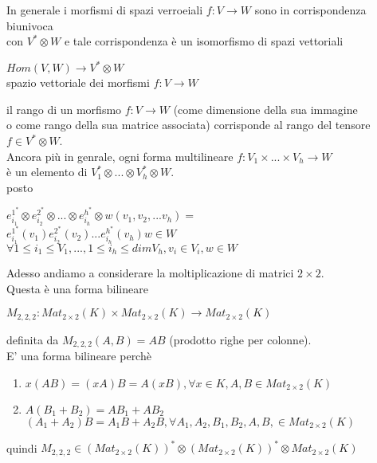 \documentclass[a4paper,12pt]{article}
\theoremstyle{def}
\theoremstyle{prop}
\theoremstyle{esempio}
\theoremstyle{dimostrazione}
\theoremstyle{teo}
\theoremstyle{osservazione}
\begin{document}
In generale i morfismi di spazi verroeiali \(f: V \rightarrow W\) sono in corrispondenza biunivoca\\
con \(V^* \otimes W\) e tale corrispondenza è un isomorfismo di spazi vettoriali
\begin{center}
	\(Hom(V, W) \rightarrow V^* \otimes W\)\\
	spazio vettoriale dei morfismi \(f: V \rightarrow W\)
\end{center}
il rango di un morfismo \(f: V \rightarrow W\) (come dimensione della sua immagine \\
o come rango della sua matrice associata) corrisponde al rango del tensore \(f \in V^* \otimes W\).\vspace{\baselineskip}\\
Ancora più in genrale, ogni forma multilineare \(f: V_1 \times ... \times V_h \rightarrow W\)\\
è un elemento di \(V_1^* \otimes ... \otimes V_h^* \otimes W\).\\
posto
\begin{center}
	\(e_{i_1}^{1^*} \otimes e_{i_2}^{2^*} \otimes ... \otimes e_{i_h}^{h^*} \otimes w (v_1, v_2, ... v_h) = \)\\
	\(e_{i_1}^{1^*}(v_1)e_{i_2}^{2^*}(v_2) ... e_{i_h}^{h^*}(v_h)w \in W\)\\
	\(\forall 1 \leq i_1 \leq V_1, ..., 1 \leq i_h \leq dim V_h, v_i \in V_i, w \in W\)\vspace{\baselineskip}
\end{center}
Adesso andiamo a considerare la moltiplicazione di matrici \(2 \times 2\).\\
Questa è una forma bilineare
\begin{center}
	\(M_{2,2,2} : Mat_{2 \times 2} (K) \times Mat_{2 \times 2} (K) \rightarrow Mat_{2 \times 2} (K)\)
\end{center}
definita da \(M_{2,2,2}(A,B)= AB\) (prodotto righe per colonne).\\
E' una forma bilineare perchè
\begin{enumerate}
	\item \(x(AB) = (xA)B = A(xB), \forall x \in K, A,B \in Mat_{2 \times 2} (K)\)
	\item \(A(B_1 + B_2) = AB_1 + AB_2\)\\
	      \((A_1 + A_2)B = A_1B + A_2B, \forall A_1, A_2, B_1, B_2, A, B, \in Mat_{2 \times 2} (K)\)
\end{enumerate}
quindi \(M_{2,2,2} \in (Mat_{2 \times 2} (K))^* \otimes (Mat_{2 \times 2} (K))^* \otimes Mat_{2 \times 2} (K)\)\\
\end{document}
